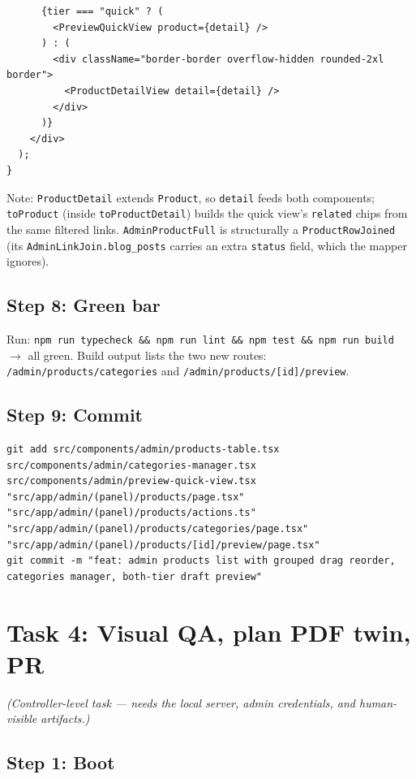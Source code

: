 \documentclass[11pt,a4paper]{article}
\begin{document}
\begin{lstlisting}
      {tier === "quick" ? (
        <PreviewQuickView product={detail} />
      ) : (
        <div className="border-border overflow-hidden rounded-2xl border">
          <ProductDetailView detail={detail} />
        </div>
      )}
    </div>
  );
}
\end{lstlisting}

Note: \texttt{ProductDetail} extends \texttt{Product}, so \texttt{detail} feeds both components;
\texttt{toProduct} (inside \texttt{toProductDetail}) builds the quick view's \texttt{related} chips from
the same filtered links. \texttt{AdminProductFull} is structurally a \texttt{ProductRowJoined} (its
\texttt{AdminLinkJoin.blog\_posts} carries an extra \texttt{status} field, which the mapper ignores).

\subsection*{Step 8: Green bar}

Run: \texttt{npm run typecheck \&\& npm run lint \&\& npm test \&\& npm run build} $\rightarrow$ all
green. Build output lists the two new routes: \texttt{/admin/products/categories} and
\texttt{/admin/products/[id]/preview}.

\subsection*{Step 9: Commit}

\begin{lstlisting}
git add src/components/admin/products-table.tsx src/components/admin/categories-manager.tsx src/components/admin/preview-quick-view.tsx "src/app/admin/(panel)/products/page.tsx" "src/app/admin/(panel)/products/actions.ts" "src/app/admin/(panel)/products/categories/page.tsx" "src/app/admin/(panel)/products/[id]/preview/page.tsx"
git commit -m "feat: admin products list with grouped drag reorder, categories manager, both-tier draft preview"
\end{lstlisting}

\section{Task 4: Visual QA, plan PDF twin, PR}

\textit{(Controller-level task --- needs the local server, admin credentials, and human-visible
artifacts.)}

\subsection*{Step 1: Boot}
\end{document}
